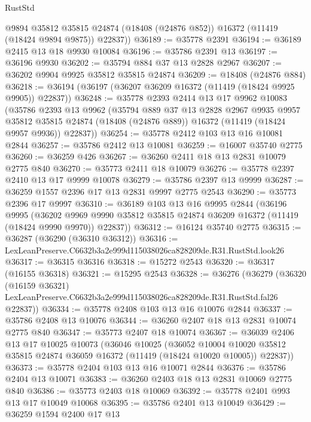 \begin{lexlean}{RustStd}
\begin{coremodule}
        @9894
        @35812
        @35815
        @24874
        (@18408 (@24876 @852))
        @16372
        (@11419 (@18424 @9894 @9875))
        @22837))
@36189 := @35778 @2391
@36194 := @36189 @2415 @13 @18 @9930 @10084
@36196 := @35786 @2391 @13
@36197 := @36196 @9930
@36202 := @35794 @884 @37 @13 @2828 @2967
@36207 := @36202 @9904 @9925 @35812 @35815 @24874
@36209 := @18408 (@24876 @884)
@36218 := @36194 (@36197 (@36207 @36209 @16372 (@11419 (@18424 @9925 @9905)) @22837))
@36248 := @35778
    @2393
    @2414
    @13
    @17
    @9962
    @10083
    (@35786
      @2393
      @13
      @9962
      (@35794
        @889
        @37
        @13
        @2828
        @2967
        @9935
        @9957
        @35812
        @35815
        @24874
        (@18408 (@24876 @889))
        @16372
        (@11419 (@18424 @9957 @9936))
        @22837))
@36254 := @35778 @2412 @103 @13 @16 @10081 @2844
@36257 := @35786 @2412 @13 @10081
@36259 := @16007 @35740 @2775
@36260 := @36259 @426
@36267 := @36260 @2411 @18 @13 @2831 @10079 @2775 @840
@36270 := @35773 @2411 @18 @10079
@36276 := @35778 @2397 @2410 @13 @17 @9999 @10078
@36279 := @35786 @2397 @13 @9999
@36287 := @36259 @1557 @2396 @17 @13 @2831 @9997 @2775 @2543
@36290 := @35773 @2396 @17 @9997
@36310 := @36189
    @103
    @13
    @16
    @9995
    @2844
    (@36196
      @9995
      (@36202 @9969 @9990 @35812 @35815 @24874 @36209 @16372 (@11419 (@18424 @9990 @9970)) @22837))
@36312 := @16124 @35740 @2775
@36315 := @36287 (@36290 (@36310 @36312))
@36316 := LexLeanPreserve.C6632b3a2e999d115038026ca828209de.R31.RustStd.look26
@36317 := @36315 @36316
@36318 := @15272 @2543
@36320 := @36317 (@16155 @36318)
@36321 := @15295 @2543
@36328 := @36276
    (@36279
      (@36320
        (@16159 @36321)
        LexLeanPreserve.C6632b3a2e999d115038026ca828209de.R31.RustStd.fal26
        @22837))
@36334 := @35778 @2408 @103 @13 @16 @10076 @2844
@36337 := @35786 @2408 @13 @10076
@36344 := @36260 @2407 @18 @13 @2831 @10074 @2775 @840
@36347 := @35773 @2407 @18 @10074
@36367 := @36039
    @2406
    @13
    @17
    @10025
    @10073
    (@36046
      @10025
      (@36052
        @10004
        @10020
        @35812
        @35815
        @24874
        @36059
        @16372
        (@11419 (@18424 @10020 @10005))
        @22837))
@36373 := @35778 @2404 @103 @13 @16 @10071 @2844
@36376 := @35786 @2404 @13 @10071
@36383 := @36260 @2403 @18 @13 @2831 @10069 @2775 @840
@36386 := @35773 @2403 @18 @10069
@36392 := @35778 @2401 @993 @13 @17 @10049 @10068
@36395 := @35786 @2401 @13 @10049
@36429 := @36259
    @1594
    @2400
    @17
    @13

\end{coremodule}
\end{lexlean}
